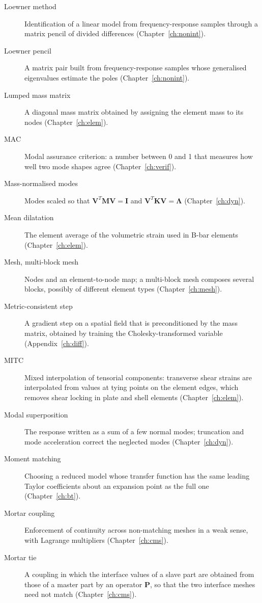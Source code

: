 \begin{description}
\item[Loewner method] Identification of a linear model from frequency-response samples through a matrix pencil of divided differences (Chapter~\ref{ch:nonint}).
\item[Loewner pencil] A matrix pair built from frequency-response samples whose generalised eigenvalues estimate the poles (Chapter~\ref{ch:nonint}).
\item[Lumped mass matrix] A diagonal mass matrix obtained by assigning the element mass to its nodes (Chapter~\ref{ch:elem}).
\item[MAC] Modal assurance criterion: a number between 0 and 1 that measures how well two mode shapes agree (Chapter~\ref{ch:verif}).
\item[Mass-normalised modes] Modes scaled so that $\bm V^T\bm M\bm V=\bm I$ and $\bm V^T\bm K\bm V=\bm\Lambda$ (Chapter~\ref{ch:dyn}).
\item[Mean dilatation] The element average of the volumetric strain used in B-bar elements (Chapter~\ref{ch:elem}).
\item[Mesh, multi-block mesh] Nodes and an element-to-node map; a multi-block mesh composes several blocks, possibly of different element types (Chapter~\ref{ch:mesh}).
\item[Metric-consistent step] A gradient step on a spatial field that is preconditioned by the mass matrix, obtained by training the Cholesky-transformed variable (Appendix~\ref{ch:diff}).
\item[MITC] Mixed interpolation of tensorial components: transverse shear strains are interpolated from values at tying points on the element edges, which removes shear locking in plate and shell elements (Chapter~\ref{ch:elem}).
\item[Modal superposition] The response written as a sum of a few normal modes; truncation and mode acceleration correct the neglected modes (Chapter~\ref{ch:dyn}).
\item[Moment matching] Choosing a reduced model whose transfer function has the same leading Taylor coefficients about an expansion point as the full one (Chapter~\ref{ch:bt}).
\item[Mortar coupling] Enforcement of continuity across non-matching meshes in a weak sense, with Lagrange multipliers (Chapter~\ref{ch:cms}).
\item[Mortar tie] A coupling in which the interface values of a slave part are obtained from those of a master part by an operator $\bm P$, so that the two interface meshes need not match (Chapter~\ref{ch:cms}).

\end{description}
